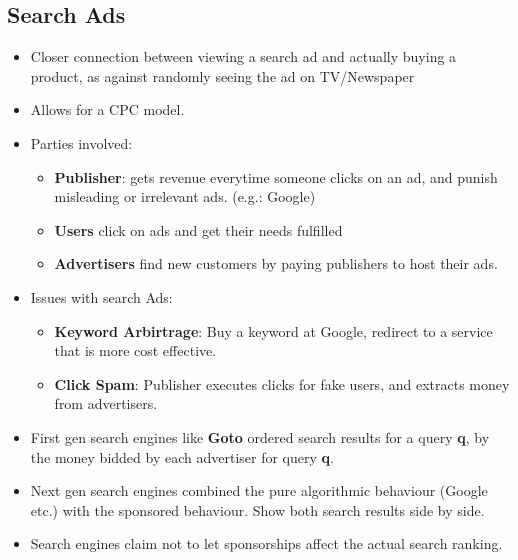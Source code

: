 \documentclass{article}
\begin{document}
\subsection{Search Ads}
\begin{itemize}
    \item Closer connection between viewing a search ad and actually buying a product, as against randomly seeing the ad on TV/Newspaper
    
    \item Allows for a CPC model.
    
    \item Parties involved:
    \begin{itemize}
        \item \textbf{Publisher}: gets revenue everytime someone clicks on an ad, and punish misleading or irrelevant ads. (e.g.: Google)
        
        \item \textbf{Users} click on ads and get their needs fulfilled
        
        \item \textbf{Advertisers} find new customers by paying publishers to host their ads.
    \end{itemize}
    
    \item Issues with search Ads:
    \begin{itemize}
        \item \textbf{Keyword Arbirtrage}: Buy a keyword at Google, redirect to a service that is more cost effective. 
        
        \item \textbf{Click Spam}: Publisher executes clicks for fake users, and extracts money from advertisers.
    \end{itemize}
    
    \item First gen search engines like \textbf{Goto} ordered search results for a query \textbf{q}, by the money bidded by each advertiser for query \textbf{q}.
    
    \item Next gen search engines combined the pure algorithmic behaviour (Google etc.) with the sponsored behaviour. Show both search results side by side.
    
    \item Search engines claim not to let sponsorships affect the actual search ranking.  
\end{itemize}
\end{document}

